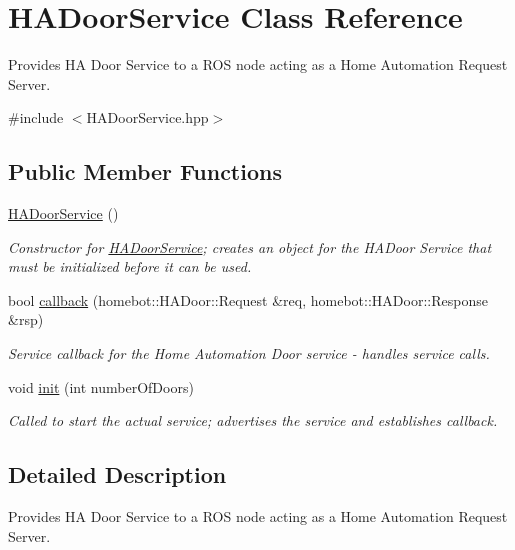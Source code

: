 \hypertarget{classHADoorService}{\section{H\-A\-Door\-Service Class Reference}
\label{classHADoorService}
}


Provides H\-A Door Service to a R\-O\-S node acting as a Home Automation Request Server.  




{\ttfamily \#include $<$H\-A\-Door\-Service.\-hpp$>$}

\subsection*{Public Member Functions}
\begin{DoxyCompactItemize}
\item 
\hypertarget{classHADoorService_a3aa65770c2ca9f393bc45e1facbd68c9}{\hyperlink{classHADoorService_a3aa65770c2ca9f393bc45e1facbd68c9}{H\-A\-Door\-Service} ()}\label{classHADoorService_a3aa65770c2ca9f393bc45e1facbd68c9}

\begin{DoxyCompactList}\small\item\em Constructor for \hyperlink{classHADoorService}{H\-A\-Door\-Service}; creates an object for the H\-A\-Door Service that must be initialized before it can be used. \end{DoxyCompactList}\item 
bool \hyperlink{classHADoorService_afe7dcaf57f6350784dd1df5724719459}{callback} (homebot\-::\-H\-A\-Door\-::\-Request \&req, homebot\-::\-H\-A\-Door\-::\-Response \&rsp)
\begin{DoxyCompactList}\small\item\em Service callback for the Home Automation Door service -\/ handles service calls. \end{DoxyCompactList}\item 
void \hyperlink{classHADoorService_a5486fe40d0145da762b4453d8659bee0}{init} (int number\-Of\-Doors)
\begin{DoxyCompactList}\small\item\em Called to start the actual service; advertises the service and establishes callback. \end{DoxyCompactList}\end{DoxyCompactItemize}


\subsection{Detailed Description}
Provides H\-A Door Service to a R\-O\-S node acting as a Home Automation Request Server. 

